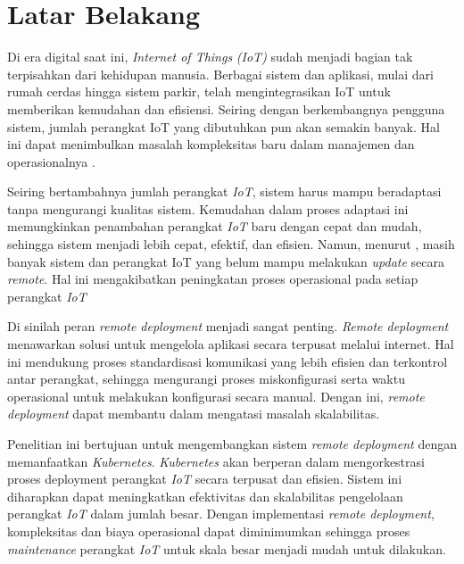 \section{Latar Belakang}
\label{sec:latar-belakang}

Di era digital saat ini, \textit{Internet of Things} \textit{(IoT)} sudah menjadi bagian tak terpisahkan dari kehidupan manusia. Berbagai sistem dan aplikasi, mulai dari rumah cerdas hingga sistem parkir, telah mengintegrasikan IoT untuk memberikan kemudahan dan efisiensi. Seiring dengan berkembangnya pengguna sistem, jumlah perangkat IoT yang dibutuhkan pun akan semakin banyak. Hal ini dapat menimbulkan masalah kompleksitas baru dalam manajemen dan operasionalnya \parencite{IOTSmartCity}.

Seiring bertambahnya jumlah perangkat \textit{IoT}, sistem harus mampu beradaptasi tanpa mengurangi kualitas sistem. Kemudahan dalam proses adaptasi ini memungkinkan penambahan perangkat \textit{IoT} baru dengan cepat dan mudah, sehingga sistem menjadi lebih cepat, efektif, dan efisien. Namun, menurut \parencite{RemoteDeployment}, masih banyak sistem dan perangkat IoT yang belum mampu melakukan \textit{update} secara \textit{remote}. Hal ini mengakibatkan peningkatan proses operasional pada setiap perangkat \textit{IoT}

Di sinilah peran \textit{remote deployment} menjadi sangat penting. \textit{Remote deployment} menawarkan solusi untuk mengelola aplikasi secara terpusat melalui internet. Hal ini mendukung proses standardisasi komunikasi yang lebih efisien dan terkontrol antar perangkat, sehingga mengurangi proses miskonfigurasi serta waktu operasional untuk melakukan konfigurasi secara manual. Dengan ini, \textit{remote deployment} dapat membantu dalam mengatasi masalah skalabilitas.

Penelitian ini bertujuan untuk mengembangkan sistem \textit{remote deployment} dengan memanfaatkan \textit{Kubernetes}. \textit{Kubernetes} akan berperan dalam mengorkestrasi proses deployment perangkat \textit{IoT} secara terpusat dan efisien. Sistem ini diharapkan dapat meningkatkan efektivitas dan skalabilitas pengelolaan perangkat \textit{IoT} dalam jumlah besar. Dengan implementasi \textit{remote deployment}, kompleksitas dan biaya operasional dapat diminimumkan sehingga proses \textit{maintenance} perangkat \textit{IoT} untuk skala besar menjadi mudah untuk dilakukan.